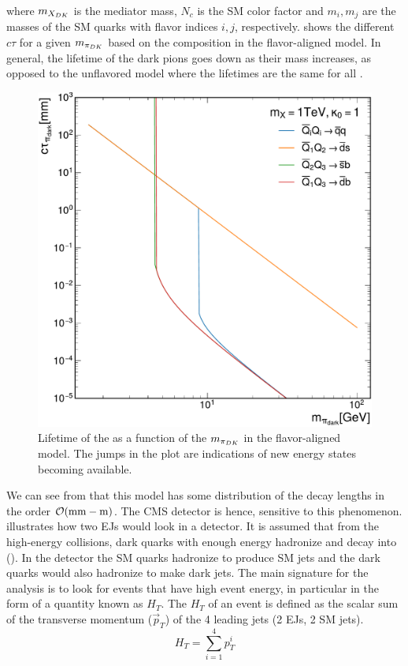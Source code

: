 where $m_{X_{DK}}$ is the mediator mass, $N_c$ is the SM color factor and $m_i, m_j$ are the masses of the SM quarks with flavor indices $i, j$, respectively\cite{CMS:2024gxp}.
 shows the different $c\tau$ for a given $m_{\pi_{DK}}$ based on the \pidark composition in the flavor-aligned model. In general, the lifetime of the dark pions goes down as their mass increases, as opposed to the unflavored model where the lifetimes are the same for all \pidark.
\begin{figure}[b]
	\centering
	\includegraphics[width=.65\linewidth]{Images/pdfs/FlavoredLifetime.pdf}
	\caption[Lifetimes of the dark pions as a function of their mass.]{Lifetime of the \pidark as a function of the $m_{\pi_{DK}}$ in the flavor-aligned model. The jumps in the plot are indications of new energy states becoming available.}
	\label{fig:lifetimes}
\end{figure}

We can see from  that this model has some distribution of the decay lengths in the order $\order{\unit{mm} - \unit{m}}$. The CMS detector is hence, sensitive to this phenomenon.
 illustrates how two EJs would look in a detector. It is assumed that from the high-energy collisions, dark quarks with enough energy hadronize and decay into (\pidark). In the detector the SM quarks hadronize to produce SM jets and the dark quarks would also hadronize to make dark jets. The main signature for the analysis is to look for events that have high event energy, in particular in the form of a quantity known as $H_T$. The $H_T$ of an event is defined as the scalar sum of the transverse momentum ($\Vec{p}_T$) of the 4 leading jets (2 EJs, 2 SM jets).
\begin{equation}
	H_T = \sum_{i=1}^4 p_T^i
\end{equation}

